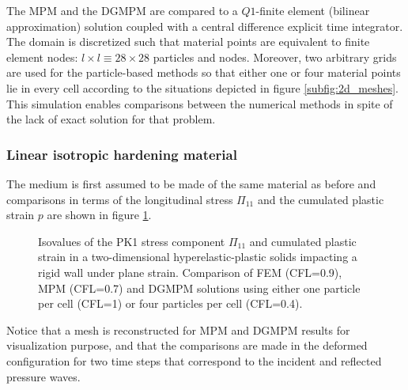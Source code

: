 The MPM and the DGMPM are compared to a $Q1$-finite element (bilinear approximation) solution coupled with a central difference explicit time integrator.
The domain is discretized such that material points are equivalent to finite element nodes: $l\times l \equiv 28 \times 28$ particles and nodes.
Moreover, two arbitrary grids are used for the particle-based methods so that either one or four material points lie in every cell according to the situations depicted in figure \ref{subfig:2d_meshes}.
This simulation enables comparisons between the numerical methods in spite of the lack of exact solution for that problem.

\subsubsection{Linear isotropic hardening material}
\label{sec:line-isotr-hard}

The medium is first assumed to be made of the same material as before and comparisons in terms of the longitudinal stress $\Pi_{11}$ and the cumulated plastic strain $p$ are shown in figure \ref{fig:PS_taylor}.
\begin{figure}[h!]
  \centering
  \qquad
  \caption{Isovalues of the PK1 stress component $\Pi_{11}$ and cumulated plastic strain in a two-dimensional hyperelastic-plastic solids impacting a rigid wall under plane strain. Comparison of FEM (CFL=0.9), MPM (CFL=0.7) and DGMPM solutions using either one particle per cell (CFL=1) or four particles per cell (CFL=0.4).}
  \label{fig:PS_taylor}
\end{figure}
Notice that a mesh is reconstructed for MPM and DGMPM results for visualization purpose, and that the comparisons are made in the deformed configuration for two time steps that correspond to the incident and reflected pressure waves.

